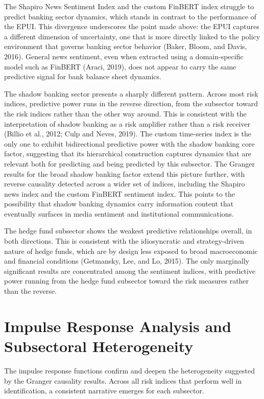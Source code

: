 \documentclass[12pt,a4paper]{report}
\begin{document}
The Shapiro News Sentiment Index and the custom FinBERT index struggle to
predict banking sector dynamics, which stands in contrast to the performance of
the EPUI. This divergence underscores the point made above: the EPUI captures
a different dimension of uncertainty, one that is more directly linked to the
policy environment that governs banking sector behavior (Baker, Bloom, and Davis,
2016). General news sentiment, even when extracted using a domain-specific model
such as FinBERT (Araci, 2019), does not appear to carry the same predictive
signal for bank balance sheet dynamics.

The shadow banking sector presents a sharply different pattern. Across most
risk indices, predictive power runs in the reverse direction, from the subsector
toward the risk indices rather than the other way around. This is consistent
with the interpretation of shadow banking as a risk amplifier rather than a
risk receiver (Billio et al., 2012; Culp and Neves, 2019). The custom time-series
index is the only one to exhibit bidirectional predictive power with the shadow
banking core factor, suggesting that its hierarchical construction captures dynamics
that are relevant both for predicting and being predicted by this subsector. The
Granger results for the broad shadow banking factor extend this picture further,
with reverse causality detected across a wider set of indices, including the Shapiro
news index and the custom FinBERT sentiment index. This points to the possibility
that shadow banking dynamics carry information content that eventually surfaces
in media sentiment and institutional communications.

The hedge fund subsector shows the weakest predictive relationships overall,
in both directions. This is consistent with the idiosyncratic and strategy-driven
nature of hedge funds, which are by design less exposed to broad macroeconomic
and financial conditions (Getmansky, Lee, and Lo, 2015). The only marginally
significant results are concentrated among the sentiment indices, with predictive
power running from the hedge fund subsector toward the risk measures rather than
the reverse.

\section{Impulse Response Analysis and Subsectoral Heterogeneity}

The impulse response functions confirm and deepen the heterogeneity suggested
by the Granger causality results. Across all risk indices that perform well in
identification, a consistent narrative emerges for each subsector.
\end{document}
